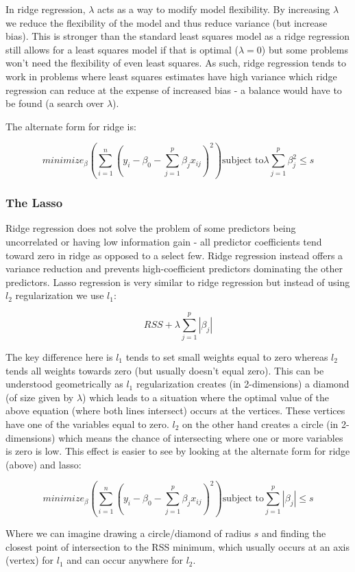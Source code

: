 In ridge regression, $\lambda$ acts as a way to modify model flexibility. By increasing $\lambda$ we reduce the flexibility of the model and thus reduce variance (but increase bias). This is stronger than the standard least squares model as a ridge regression still allows for a least squares model if that is optimal ($\lambda = 0$) but some problems won't need the flexibility of even least squares. As such, ridge regression tends to work in problems where least squares estimates have high variance which ridge regression can reduce at the expense of increased bias - a balance would have to be found (a search over $\lambda$).

The alternate form for ridge is:

$$ minimize_{\beta} \left( \sum^{n}_{i=1} (y_{i}-\beta_{0} - \sum^{p}_{j=1}\beta_{j}x_{ij})^{2} \right) \text{subject to} \lambda \sum^{p}_{j=1}\beta_{j}^{2} \leq s $$

\subsubsection{The Lasso}

Ridge regression does not solve the problem of some predictors being uncorrelated or having low information gain - all predictor coefficients tend toward zero in ridge as opposed to a select few. Ridge regression instead offers a variance reduction and prevents high-coefficient predictors dominating the other predictors. Lasso regression is very similar to ridge regression but instead of using $l_{2}$ regularization we use $l_{1}$:

$$ RSS + \lambda \sum^{p}_{j=1}|\beta_{j}| $$

The key difference here is $l_{1}$ tends to set small weights equal to zero whereas $l_{2}$ tends all weights towards zero (but usually doesn't equal zero). This can be understood geometrically as $l_{1}$ regularization creates (in 2-dimensions) a diamond (of size given by $\lambda$) which leads to a situation where the optimal value of the above equation (where both lines intersect) occurs at the vertices. These vertices have one of the variables equal to zero. $l_{2}$ on the other hand creates a circle (in 2-dimensions) which means the chance of intersecting where one or more variables is zero is low. This effect is easier to see by looking at the alternate form for ridge (above) and lasso:

$$ minimize_{\beta} \left( \sum^{n}_{i=1} (y_{i}-\beta_{0} - \sum^{p}_{j=1}\beta_{j}x_{ij})^{2} \right) \text{subject to} \sum_{j=1}^{p}|\beta_{j}| \leq s $$

Where we can imagine drawing a circle/diamond of radius $s$ and finding the closest point of intersection to the RSS minimum, which usually occurs at an axis (vertex) for $l_{1}$ and can occur anywhere for $l_{2}$.
